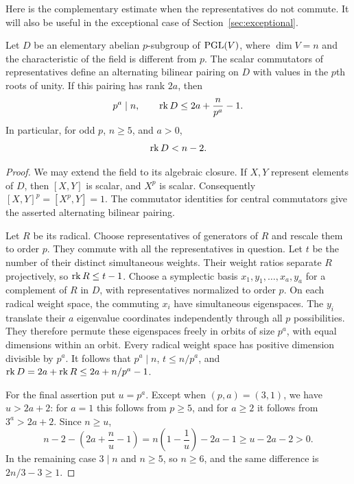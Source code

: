 Here is the complementary estimate when the representatives do not commute.
It will also be useful in the exceptional case of Section~\ref{sec:exceptional}.

\begin{lemma}\label{lem:projective-rank}
Let $D$ be an elementary abelian $p$-subgroup of $\operatorname{PGL}(V)$, where
$\dim V=n$ and the characteristic of the field is different from $p$.
The scalar commutators of representatives define an alternating bilinear
pairing on $D$ with values in the $p$th roots of unity.  If this pairing
has rank $2a$, then
\[
 p^a\mid n,
 \qquad
 \operatorname{rk} D\le 2a+\frac{n}{p^a}-1.
\]
In particular, for odd $p$, $n\ge5$, and $a>0$,
\begin{equation}\label{eq:odd-pairing-strict}
 \operatorname{rk} D<n-2.
\end{equation}
\end{lemma}

\begin{proof}
We may extend the field to its algebraic closure.  If $X,Y$ represent
elements of $D$, then $[X,Y]$ is scalar, and $X^p$ is scalar.  Consequently
$[X,Y]^p=[X^p,Y]=1$.  The commutator identities for central commutators
give the asserted alternating bilinear pairing.

Let $R$ be its radical.  Choose representatives of generators of $R$ and
rescale them to order $p$.  They commute with all the representatives in
question.  Let $t$ be the number of their distinct simultaneous weights.
Their weight ratios separate $R$ projectively, so $\operatorname{rk} R\le t-1$.
Choose a symplectic basis $x_1,y_1,\ldots,x_a,y_a$ for a complement of $R$
in $D$, with representatives normalized to order $p$.  On each radical
weight space, the commuting $x_i$ have simultaneous eigenspaces.
The $y_i$ translate their $a$ eigenvalue coordinates independently through
all $p$ possibilities.  They therefore permute these eigenspaces freely
in orbits of size $p^a$, with equal dimensions within an orbit.
Every radical weight space has positive dimension divisible by $p^a$.
It follows that $p^a\mid n$, $t\le n/p^a$, and
$\operatorname{rk} D=2a+\operatorname{rk} R\le 2a+n/p^a-1$.

For the final assertion put $u=p^a$.  Except when $(p,a)=(3,1)$,
we have $u>2a+2$: for $a=1$ this follows from $p\ge5$, and for $a\ge2$
it follows from $3^a>2a+2$.  Since $n\ge u$,
\[
 n-2-\left(2a+\frac n u-1\right)
 =n\left(1-\frac1u\right)-2a-1
 \ge u-2a-2>0.
\]
In the remaining case $3\mid n$ and $n\ge5$, so $n\ge6$, and the
same difference is $2n/3-3\ge1$.
\end{proof}

